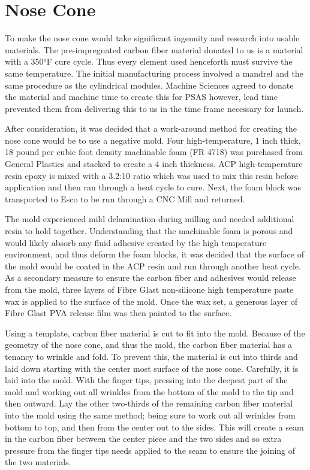 \documentclass{aiaa-tc}%
\begin{document}
\section{Nose Cone}\label{sec:noseCone}

To make the nose cone would take significant ingenuity and research into usable materials. The pre-impregnated carbon fiber material donated to us is a material with a 350°F cure cycle. Thus every element used henceforth must survive the same temperature. The initial manufacturing process involved a mandrel and the same procedure as the cylindrical modules. Machine Sciences agreed to donate the material and machine time to create this for PSAS however, lead time prevented them from delivering this to us in the time frame necessary for launch. 

After consideration, it was decided that a work-around method for creating the nose cone would be to use a negative mold. Four high-temperature, 1 inch thick, 18 pound per cubic foot density machinable foam (FR 4718) was purchased from General Plastics and stacked to create a 4 inch thickness. ACP high-temperature resin epoxy is mixed with a 3.2:10 ratio which was used to mix this resin before application and then ran through a heat cycle to cure. Next, the foam block was transported to Esco to be run through a CNC Mill and returned. 

The mold experienced mild delamination during milling and needed additional resin to hold together. Understanding that the machinable foam is porous and would likely absorb any fluid adhesive created by the high temperature environment, and thus deform the foam blocks, it was decided that the surface of the mold would be coated in the ACP resin and run through another heat cycle. As a secondary measure to ensure the carbon fiber and adhesives would release from the mold, three layers of Fibre Glast non-silicone high temperature paste wax is applied to the surface of the mold. Once the wax set, a generous layer of Fibre Glast PVA release film was then painted to the surface. 

Using a template, carbon fiber material is cut to fit into the mold. Because of the geometry of the nose cone, and thus the mold, the carbon fiber material has a tenancy to wrinkle and fold. To prevent this, the material is cut into thirds and laid down starting with the center most surface of the nose cone. Carefully, it is laid into the mold. With the finger tips, pressing into the deepest part of the mold and working out all wrinkles from the bottom of the mold to the tip and then outward. Lay the other two-thirds of the remaining carbon fiber material into the mold using the same method; being sure to work out all wrinkles from bottom to top, and then from the center out to the sides. This will create a seam in the carbon fiber between the center piece and the two sides and so extra pressure from the finger tips needs applied to the seam to ensure the joining of the two materials.
\end{document}
